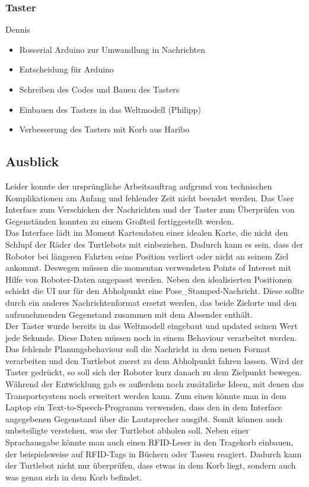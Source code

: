 \documentclass[a4paper,12pt,headsepline]{scrartcl}
\begin{document}
	\subsubsection{Taster}
		Dennis\\
		\begin{itemize}
			\item Rosserial Arduino zur Umwandlung in Nachrichten
			\item Entscheidung für Arduino
			\item Schreiben des Codes und Bauen des Tasters
			\item Einbauen des Tasters in das Weltmodell (Philipp)
			\item Verbesserung des Tasters mit Korb aus Haribo
		\end{itemize}
	
	\subsection{Ausblick}
		Leider konnte der ursprüngliche Arbeitsauftrag aufgrund von technischen Komplikationen am Anfang und fehlender Zeit nicht beendet werden. Das User Interface zum Verschicken der Nachrichten und der Taster zum Überprüfen von Gegenständen konnten zu einem Großteil fertiggestellt werden.\\
		Das Interface lädt im Moment Kartendaten einer idealen Karte, die nicht den Schlupf der Räder des Turtlebots mit einbeziehen. Dadurch kann es sein, dass der Roboter bei längeren Fahrten seine Position verliert oder nicht an seinem Ziel ankommt. Deswegen müssen die momentan verwendeten Points of Interest mit Hilfe von Roboter-Daten angepasst werden. Neben den idealisierten Positionen schickt die UI nur für den Abholpunkt eine \glqq Pose{\_}Stamped\grqq-Nachricht. Diese sollte durch ein anderes Nachrichtenformat ersetzt werden, das beide Zielorte und den aufzunehmenden Gegenstand zusammen mit dem Absender enthält.\\
		Der Taster wurde bereits in das Weltmodell eingebaut und updated seinen Wert jede Sekunde. Diese Daten müssen noch in einem Behaviour verarbeitet werden. Das fehlende Planungsbehaviour soll die Nachricht in dem neuen Format verarbeiten und den Turtlebot zuerst zu dem Abholpunkt fahren lassen. Wird der Taster gedrückt, so soll sich der Roboter kurz danach zu dem Zielpunkt bewegen.\\
		Während der Entwicklung gab es außerdem noch zusätzliche Ideen, mit denen das Transportsystem noch erweitert werden kann. Zum einen könnte man in dem Laptop ein Text-to-Speech-Programm verwenden, dass den in dem Interface angegebenen Gegenstand über die Lautsprecher ausgibt. Somit können auch unbeteiligte verstehen, was der Turtlebot abholen soll. Neben einer Sprachausgabe könnte man auch einen RFID-Leser in den Tragekorb einbauen, der beispielsweise auf RFID-Tags in Büchern oder Tassen reagiert. Dadurch kann der Turtlebot nicht nur überprüfen, dass etwas in dem Korb liegt, sondern auch was genau sich in dem Korb befindet.
		
\end{document}
